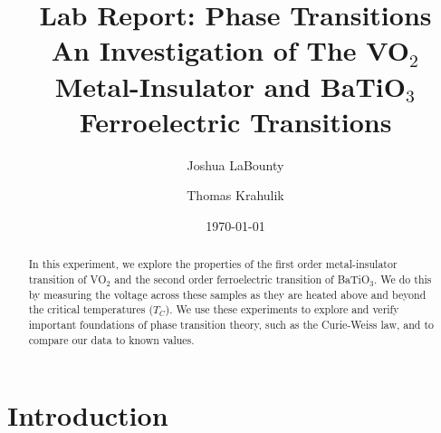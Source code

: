 \documentclass[%
 reprint,
 amsmath,amssymb,
 aps,
 pra,
]{revtex4-1}
\begin{document}

\title{\textbf{Lab Report: Phase Transitions} \\ \small{An Investigation of The VO$_2$ Metal-Insulator and BaTiO$_3$ Ferroelectric Transitions}}
\author{Joshua LaBounty}
\author{Thomas Krahulik}

\date{\today}

\begin{abstract}
	In this experiment, we explore the properties of the first order metal-insulator transition of VO$_2$ and the second order ferroelectric transition of BaTiO$_3$. We do this by measuring the voltage across these samples as they are heated above and beyond the critical temperatures ($T_C$). We use these experiments to explore and verify important foundations of phase transition theory, such as the Curie-Weiss law, and to compare our data to known values.
\end{abstract}
\maketitle

\section{Introduction}
\end{document}
